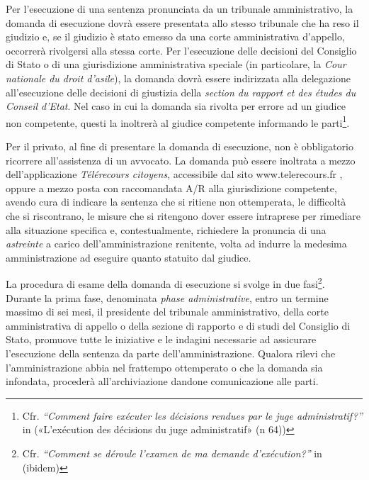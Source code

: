 \documentclass[12pt,it,a4paper,]{report}
\begin{document}
Per l'esecuzione di una sentenza pronunciata da un tribunale
amministrativo, la domanda di esecuzione dovrà essere presentata allo
stesso tribunale che ha reso il giudizio e, se il giudizio è stato
emesso da una corte amministrativa d'appello, occorrerà rivolgersi alla
stessa corte. Per l'esecuzione delle decisioni del Consiglio di Stato o
di una giurisdizione amministrativa speciale (in particolare, la
\emph{Cour nationale du droit d'asile}), la domanda dovrà essere
indirizzata alla delegazione all'esecuzione delle decisioni di giustizia
della \emph{section du rapport et des études du Conseil d'Etat}. Nel
caso in cui la domanda sia rivolta per errore ad un giudice non
competente, questi la inoltrerà al giudice competente informando le
parti\footnote{Cfr. \emph{``Comment faire exécuter les décisions rendues
  par le juge administratif?''} in ({«L'exécution des décisions du juge
  administratif»} (n 64))}.

Per il privato, al fine di presentare la domanda di esecuzione, non è
obbligatorio ricorrere all'assistenza di un avvocato. La domanda può
essere inoltrata a mezzo dell'applicazione \emph{Télérecours citoyens},
accessibile dal sito www.telerecours.fr , oppure a mezzo posta con
raccomandata A/R alla giurisdizione competente, avendo cura di indicare
la sentenza che si ritiene non ottemperata, le difficoltà che si
riscontrano, le misure che si ritengono dover essere intraprese per
rimediare alla situazione specifica e, contestualmente, richiedere la
pronuncia di una \emph{astreinte} a carico dell'amministrazione
renitente, volta ad indurre la medesima amministrazione ad eseguire
quanto statuito dal giudice.

La procedura di esame della domanda di esecuzione si svolge in due
fasi\footnote{Cfr. \emph{``Comment se déroule l'examen de ma demande
  d'exécution?''} in (ibidem)}. Durante la prima fase, denominata
\emph{phase administrative}, entro un termine massimo di sei mesi, il
presidente del tribunale amministrativo, della corte amministrativa di
appello o della sezione di rapporto e di studi del Consiglio di Stato,
promuove tutte le iniziative e le indagini necessarie ad assicurare
l'esecuzione della sentenza da parte dell'amministrazione. Qualora
rilevi che l'amministrazione abbia nel frattempo ottemperato o che la
domanda sia infondata, procederà all'archiviazione dandone comunicazione
alle parti.
\end{document}
